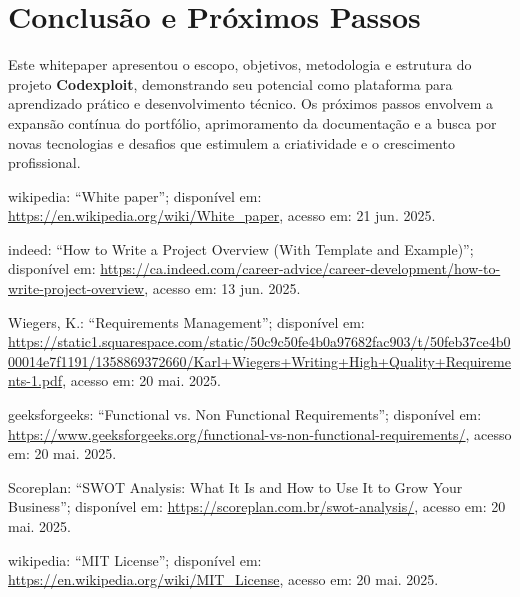 \documentclass[10pt, a4paper, oneside]{article}
\begin{document}
\section{Conclusão e Próximos Passos}

Este whitepaper apresentou o escopo, objetivos, metodologia e estrutura do projeto \textbf{Codexploit}, demonstrando seu potencial como plataforma para aprendizado prático e desenvolvimento técnico. Os próximos passos envolvem a expansão contínua do portfólio, aprimoramento da documentação e a busca por novas tecnologias e desafios que estimulem a criatividade e o crescimento profissional.\newpage





%


\begin{thebibliography}{}{
\fontsize{9pt}{10pt}\selectfont


wikipedia: ``White paper''; disponível em: \url{https://en.wikipedia.org/wiki/White_paper}, acesso em: 21 jun. 2025.

indeed: ``How to Write a Project Overview (With Template and Example)''; disponível em: \url{https://ca.indeed.com/career-advice/career-development/how-to-write-project-overview}, acesso em: 13 jun. 2025.

Wiegers, K.: ``Requirements Management''; disponível em: \url{https://static1.squarespace.com/static/50c9c50fe4b0a97682fac903/t/50feb37ce4b000014e7f1191/1358869372660/Karl+Wiegers+Writing+High+Quality+Requirements-1.pdf}, acesso em: 20 mai. 2025.

geeksforgeeks: ``Functional vs. Non Functional Requirements''; disponível em: \url{https://www.geeksforgeeks.org/functional-vs-non-functional-requirements/}, acesso em: 20 mai. 2025.

Scoreplan: ``SWOT Analysis: What It Is and How to Use It to Grow Your Business''; disponível em: \url{https://scoreplan.com.br/swot-analysis/}, acesso em: 20 mai. 2025.

wikipedia: ``MIT License''; disponível em: \url{https://en.wikipedia.org/wiki/MIT_License}, acesso em: 20 mai. 2025.

}\end{thebibliography}
\end{document}

